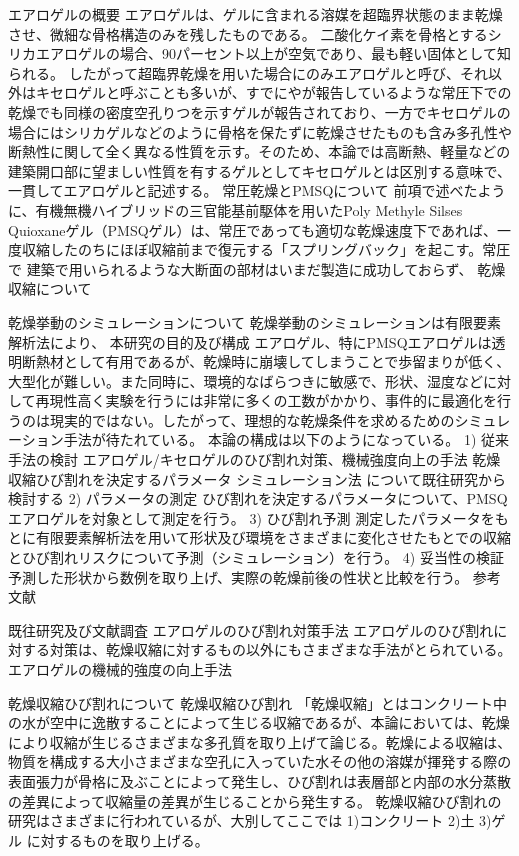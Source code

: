 \documentclass[./main]{subfiles}
\begin{document}
		エアロゲルの概要
			エアロゲルは、ゲルに含まれる溶媒を超臨界状態のまま乾燥させ、微細な骨格構造のみを残したものである。 二酸化ケイ素を骨格とするシリカエアロゲルの場合、90パーセント以上が空気であり、最も軽い固体として知られる。
			したがって超臨界乾燥を用いた場合にのみエアロゲルと呼び、それ以外はキセロゲルと呼ぶことも多いが、すでにやが報告しているような常圧下での乾燥でも同様の密度空孔りつを示すゲルが報告されており、一方でキセロゲルの場合にはシリカゲルなどのように骨格を保たずに乾燥させたものも含み多孔性や断熱性に関して全く異なる性質を示す。そのため、本論では高断熱、軽量などの建築開口部に望ましい性質を有するゲルとしてキセロゲルとは区別する意味で、一貫してエアロゲルと記述する。
		常圧乾燥とPMSQについて
			前項で述べたように、有機無機ハイブリッドの三官能基前駆体を用いたPoly Methyle Silses Quioxaneゲル（PMSQゲル）は、常圧であっても適切な乾燥速度下であれば、一度収縮したのちにほぼ収縮前まで復元する「スプリングバック」を起こす。常圧で
			建築で用いられるような大断面の部材はいまだ製造に成功しておらず、
		乾燥収縮について

		乾燥挙動のシミュレーションについて
			乾燥挙動のシミュレーションは有限要素解析法により、
		本研究の目的及び構成
			エアロゲル、特にPMSQエアロゲルは透明断熱材として有用であるが、乾燥時に崩壊してしまうことで歩留まりが低く、大型化が難しい。また同時に、環境的なばらつきに敏感で、形状、湿度などに対して再現性高く実験を行うには非常に多くの工数がかかり、事件的に最適化を行うのは現実的ではない。したがって、理想的な乾燥条件を求めるためのシミュレーション手法が待たれている。
			本論の構成は以下のようになっている。
			1) 従来手法の検討
				エアロゲル/キセロゲルのひび割れ対策、機械強度向上の手法
				乾燥収縮ひび割れを決定するパラメータ
				シミュレーション法
				について既往研究から検討する
			2) パラメータの測定
				ひび割れを決定するパラメータについて、PMSQエアロゲルを対象として測定を行う。
			3) ひび割れ予測
				測定したパラメータをもとに有限要素解析法を用いて形状及び環境をさまざまに変化させたもとでの収縮とひび割れリスクについて予測（シミュレーション）を行う。
			4) 妥当性の検証
				予測した形状から数例を取り上げ、実際の乾燥前後の性状と比較を行う。
	参考文献

既往研究及び文献調査
	エアロゲルのひび割れ対策手法
		エアロゲルのひび割れに対する対策は、乾燥収縮に対するもの以外にもさまざまな手法がとられている。
	エアロゲルの機械的強度の向上手法

	乾燥収縮ひび割れについて
		乾燥収縮ひび割れ
			「乾燥収縮」とはコンクリート中の水が空中に逸散することによって生じる収縮であるが、本論においては、乾燥により収縮が生じるさまざまな多孔質を取り上げて論じる。乾燥による収縮は、物質を構成する大小さまざまな空孔に入っていた水その他の溶媒が揮発する際の表面張力が骨格に及ぶことによって発生し、ひび割れは表層部と内部の水分蒸散の差異によって収縮量の差異が生じることから発生する。
			乾燥収縮ひび割れの研究はさまざまに行われているが、大別してここでは
				1)コンクリート
				2)土
				3)ゲル
			に対するものを取り上げる。
\end{document}
